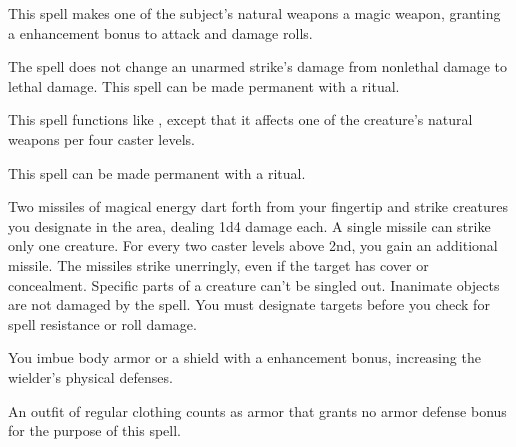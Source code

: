 \spelldur{\durshort}
\begin{spelleffect}
    This spell makes one of the subject's natural weapons a  magic weapon, granting a  enhancement bonus to attack and damage rolls. \spellbonusscalingdescription
\end{spelleffect}
\begin{spellnotes}
    The spell does not change an unarmed strike's damage from nonlethal damage to lethal damage. This spell can be made permanent with a  ritual.
\end{spellnotes}

\begin{spelleffect}
    This spell functions like , except that it affects one of the creature's natural weapons per four caster levels.
\end{spelleffect}
\begin{spellnotes}
    This spell can be made permanent with a  ritual.
\end{spellnotes}

\begin{spelleffect}
    Two missiles of magical energy dart forth from your fingertip and strike creatures you designate in the area, dealing 1d4 damage each. A single missile can strike only one creature. For every two caster levels above 2nd, you gain an additional missile.
    The missiles strike unerringly, even if the target has cover or concealment. Specific parts of a creature can't be singled out. Inanimate objects are not damaged by the spell. You must designate targets before you check for spell resistance or roll damage.
\end{spelleffect}

\spelldur{\durmed}
\begin{spelleffect}
    You imbue body armor or a shield with a  enhancement bonus, increasing the wielder's physical defenses. \spellbonusscalingdescription
\end{spelleffect}
\begin{spellnotes}
    An outfit of regular clothing counts as armor that grants no armor defense bonus for the purpose of this spell.
\end{spellnotes}

